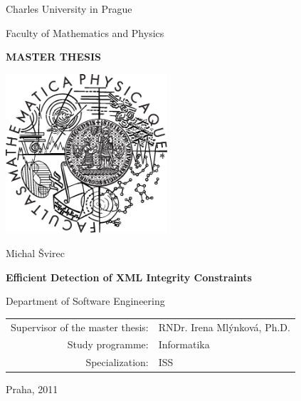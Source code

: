 \documentclass[12pt,a4paper]{report}
\def\mftitle{Efficient Detection of XML Integrity Constraints}
\def\mfthesistype{MASTER THESIS}
\def\mfkatedra{Department of Software Engineering}
\def\mfauthor{Michal Švirec}
\def\mfadvisor{RNDr. Irena Mlýnková, Ph.D.}
\def\mfplacedate{Praha, 2011}
\begin{document}


\pagestyle{empty}
\begin{center}

\large

Charles University in Prague

\medskip

Faculty of Mathematics and Physics

\vfill

{\bf\Large \mfthesistype}

\vfill

\centerline{\mbox{\includegraphics[width=60mm]{logo.eps}}}

\vfill
\vspace{5mm}

{\LARGE \mfauthor}

\vspace{15mm}

{\LARGE\bfseries \mftitle}

\vfill

\mfkatedra

\vfill

\begin{tabular}{rl}

Supervisor of the master thesis: & \mfadvisor \\
\noalign{\vspace{2mm}}
Study programme: & Informatika \\
\noalign{\vspace{2mm}}
Specialization: & ISS \\
\end{tabular}

\vfill

\mfplacedate

\end{center}
\end{document}
